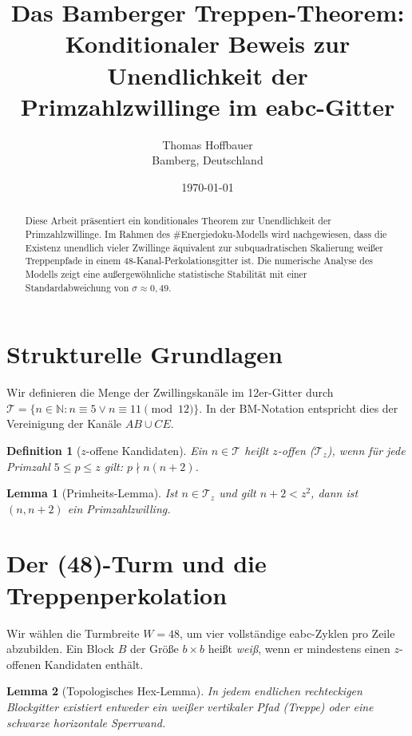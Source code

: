 \documentclass[11pt,a4paper]{article}
\title{\textbf{Das Bamberger Treppen-Theorem:\\Konditionaler Beweis zur Unendlichkeit der Primzahlzwillinge im eabc-Gitter}}
\author{Thomas Hoffbauer \\ Bamberg, Deutschland}
\date{\today}
\newtheorem{definition}{Definition}
\newtheorem{lemma}{Lemma}
\begin{document}
	
	\maketitle
	
	\begin{abstract}
		Diese Arbeit präsentiert ein konditionales Theorem zur Unendlichkeit der Primzahlzwillinge. Im Rahmen des \#Energiedoku-Modells wird nachgewiesen, dass die Existenz unendlich vieler Zwillinge äquivalent zur subquadratischen Skalierung weißer Treppenpfade in einem 48-Kanal-Perkolationsgitter ist. Die numerische Analyse des Modells zeigt eine außergewöhnliche statistische Stabilität mit einer Standardabweichung von $\sigma \approx 0,49$.
	\end{abstract}
	
	\section{Strukturelle Grundlagen}
	
	Wir definieren die Menge der Zwillingskanäle im 12er-Gitter durch $\mathcal{T} = \{n \in \mathbb{N} : n \equiv 5 \lor n \equiv 11 \pmod{12}\}$. In der BM-Notation entspricht dies der Vereinigung der Kanäle $AB \cup CE$.
	
	\begin{definition}[$z$-offene Kandidaten]
		Ein $n \in \mathcal{T}$ heißt $z$-offen ($\mathcal{T}_z$), wenn für jede Primzahl $5 \le p \le z$ gilt: $p \nmid n(n+2)$.
	\end{definition}
	
	\begin{lemma}[Primheits-Lemma]
		Ist $n \in \mathcal{T}_z$ und gilt $n+2 < z^2$, dann ist $(n, n+2)$ ein Primzahlzwilling.
	\end{lemma}
	
	\section{Der (48)-Turm und die Treppenperkolation}
	
	Wir wählen die Turmbreite $W=48$, um vier vollständige eabc-Zyklen pro Zeile abzubilden. Ein Block $B$ der Größe $b \times b$ heißt \textit{weiß}, wenn er mindestens einen $z$-offenen Kandidaten enthält.
	
	\begin{lemma}[Topologisches Hex-Lemma]
		In jedem endlichen rechteckigen Blockgitter existiert entweder ein weißer vertikaler Pfad (Treppe) oder eine schwarze horizontale Sperrwand.
	\end{lemma}
	
\end{document}
